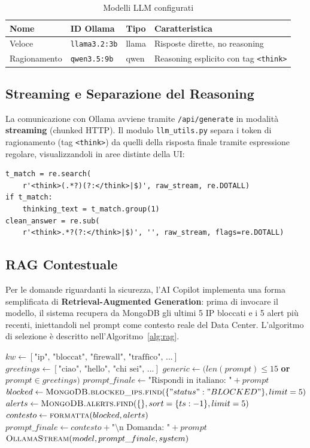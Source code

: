 \documentclass[10pt,a4paper]{article}
\begin{document}
\begin{table}[H]
\centering
\small
\begin{tabularx}{\textwidth}{@{}lllX@{}}
\toprule
\textbf{Nome} & \textbf{ID Ollama} & \textbf{Tipo} & \textbf{Caratteristica} \\
\midrule
Veloce       & \texttt{llama3.2:3b} & llama & Risposte dirette, no reasoning \\
Ragionamento & \texttt{qwen3.5:9b}  & qwen  & Reasoning esplicito con tag \texttt{<think>} \\
\bottomrule
\end{tabularx}
\caption{Modelli LLM configurati}
\end{table}

\subsection{Streaming e Separazione del Reasoning}
La comunicazione con Ollama avviene tramite \texttt{/api/generate} in modalità
\textbf{streaming} (chunked HTTP). Il modulo \texttt{llm\_utils.py} separa
i token di ragionamento (tag \texttt{<think>}) da quelli della risposta finale
tramite espressione regolare, visualizzandoli in aree distinte della UI:

\begin{lstlisting}[style=pystyle, caption={Separazione reasoning / risposta finale}]
t_match = re.search(
    r'<think>(.*?)(?:</think>|$)', raw_stream, re.DOTALL)
if t_match:
    thinking_text = t_match.group(1)
clean_answer = re.sub(
    r'<think>.*?(?:</think>|$)', '', raw_stream, flags=re.DOTALL)
\end{lstlisting}

\subsection{RAG Contestuale}
Per le domande riguardanti la sicurezza, l'AI Copilot implementa una forma
semplificata di \textbf{Retrieval-Augmented Generation}: prima di invocare il
modello, il sistema recupera da MongoDB gli ultimi 5 IP bloccati e i 5 alert più
recenti, iniettandoli nel prompt come contesto reale del Data Center.
L'algoritmo di selezione è descritto nell'Algoritmo~\ref{alg:rag}.

\begin{algorithm}[H]
\caption{RAG contestuale per l'AI Copilot}
\label{alg:rag}
\begin{algorithmic}[1]
\State $kw \gets [\text{"ip", "bloccat", "firewall", "traffico", ...}]$
\State $greetings \gets [\text{"ciao", "hello", "chi sei", ...}]$
\State $generic \gets (len(prompt) \leq 15$ \textbf{or} $prompt \in greetings)$
  \State $prompt\_finale \gets \text{"Rispondi in italiano: "} + prompt$
\Else
  \State $blocked \gets \Call{MongoDB.blocked\_ips.find}{\{"status":"BLOCKED"\}, limit=5}$
  \State $alerts \gets \Call{MongoDB.alerts.find}{\{\}, sort=\{ts:-1\}, limit=5}$
  \State $contesto \gets \Call{formatta}{blocked, alerts}$
  \State $prompt\_finale \gets contesto + \text{"\textbackslash n Domanda: "} + prompt$
\EndIf
\State \Return $\Call{OllamaStream}{model, prompt\_finale, system}$
\end{algorithmic}
\end{algorithm}
\end{document}

